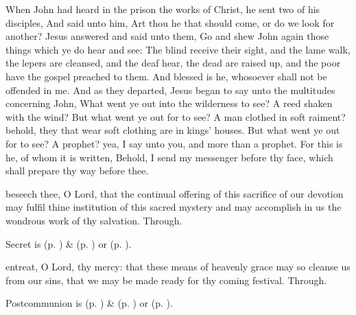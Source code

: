  When John had heard in the prison the works of Christ, he sent two of his disciples, And said unto him, Art thou he that should come, or do we look for another? Jesus answered and said unto them, Go and shew John again those things which ye do hear and see: The blind receive their sight, and the lame walk, the lepers are cleansed, and the deaf hear, the dead are raised up, and the poor have the gospel preached to them. And blessed is he, whosoever shall not be offended in me. And as they departed, Jesus began to say unto the multitudes concerning John, What went ye out into the wilderness to see? A reed shaken with the wind? But what went ye out for to see? A man clothed in soft raiment? behold, they that wear soft clothing are in kings' houses. But what went ye out for to see? A prophet? yea, I say unto you, and more than a prophet. For this is he, of whom it is written, Behold, I send my messenger before thy face, which shall prepare thy way before thee.


\secret
{} beseech thee, O Lord, that the continual offering of this sacrifice of our devotion may fulfil thine institution of this sacred mystery and may accomplish in us the wondrous work of thy salvation. Through.
\begin{rubric}
     Secret is  (p. \pageref{SPMaryInAdvent}) \&   (p. \pageref{SPAgainst}) or  (p. \pageref{SPChiefBishop}).
\end{rubric}


\postcommunion
{} entreat, O Lord, thy mercy: that these means of heavenly grace may so cleanse us from our sins, that we may be made ready for thy coming festival. Through.
\begin{rubric}
     Postcommunion is  (p. \pageref{SPMaryInAdvent}) \&   (p. \pageref{SPAgainst}) or  (p. \pageref{SPChiefBishop}).
\end{rubric}


